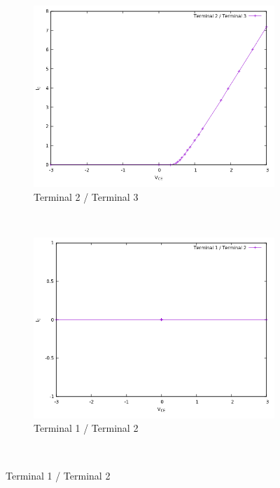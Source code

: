 \documentclass[12pt]{article}
\begin{document}
\begin{figure}[H]
	\begin{center}
	\begin{subfigure}[b]{0.85\linewidth}
	   	\includegraphics[width = \linewidth, trim = {0 0 0 0}, clip]{IV23.png}
		\caption{Terminal 2 / Terminal 3}
	\end{subfigure}\\
	\end{center}
	\begin{center}
	\begin{subfigure}[b]{0.85\linewidth}
	   	\includegraphics[width = \linewidth, trim = {0 0 0 0}, clip]{IV12.png}
		\caption{Terminal 1 / Terminal 2}
	\end{subfigure}\\
	\end{center}
\end{figure}
\end{document}
